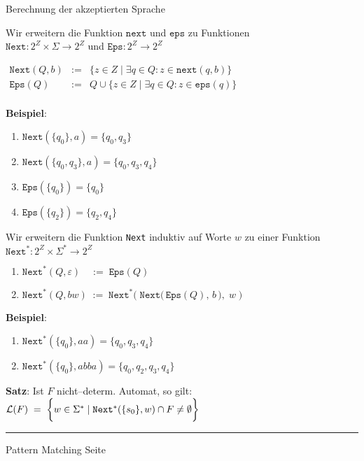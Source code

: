 \begin{slide}{}
\normalsize

\begin{center}
Berechnung der akzeptierten Sprache
\end{center}
\vspace*{0.5cm}

\footnotesize

Wir erweitern die Funktion $\mathtt{next}$ und $\mathtt{eps}$ zu Funktionen  \\[0.3cm]
\hspace*{1.3cm} $\mathtt{Next}: 2^Z \times \Sigma \rightarrow 2^Z$ \quad und \quad $\mathtt{Eps}: 2^Z \rightarrow 2^Z$

$
\begin{array}{lcl}
 \mathtt{Next}(Q,b) & := & \bigg\{ z \in Z \;|\; \exists q \in Q: z \in \mathtt{next}(q,b) \bigg\} \\[0.5cm]
 \mathtt{Eps}(Q)    & := & Q \cup \bigg\{ z \in Z \;|\; \exists q \in Q: z \in \mathtt{eps}(q) \bigg\}    \\[0.5cm]
\end{array}
$ 

\textbf{Beispiel}: 
\begin{enumerate}
\item $\mathtt{Next}(\{q_0\}, a) = \{q_0, q_3\}$
\item $\mathtt{Next}(\{q_0,q_3\}, a) = \{q_0, q_3, q_4\}$
\item $\mathtt{Eps}(\{q_0\}) = \{q_0\}$
\item $\mathtt{Eps}(\{q_2\}) = \{q_2, q_4\}$
\end{enumerate}


Wir erweitern die Funktion \texttt{Next} induktiv auf Worte $w$ zu einer Funktion \\[0.3cm]
\hspace*{1.3cm} $\texttt{Next}^*: 2^Z \times \Sigma^* \rightarrow 2^Z$
\begin{enumerate}
\item $\texttt{Next}^*(Q, \varepsilon)\quad :=\; \mathtt{Eps}(Q)$
\item $\mathtt{Next}^*(Q, bw) \;:=\; \mathtt{Next}^*\Bigg(\; \mathtt{Next}\bigg(\,\mathtt{Eps}(Q),\,b\,\bigg),\; w\;\Bigg)$
\end{enumerate}

\textbf{Beispiel}:
\begin{enumerate}
\item $\mathtt{Next}^*(\{q_0\}, aa) = \{q_0, q_3, q_4\}$
\item $\mathtt{Next}^*(\{q_0\}, abba) = \{q_0, q_2, q_3, q_4\}$
\end{enumerate}

\textbf{Satz}: Ist $F$ nicht--determ. Automat, so gilt: \\[0.3cm]
\hspace*{1.3cm} ${\cal L}(F) \;=\; \bigg\{ w \in \Sigma^* \;|\; \mathtt{Next}^*(\{s_0\},w) \cap F \not= \emptyset \bigg\}$

\vspace*{\fill}
\tiny \addtocounter{mypage}{1}
\rule{17cm}{1mm}
Pattern Matching \hspace*{\fill} Seite 
\end{slide}


